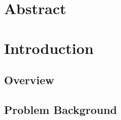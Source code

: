 \documentclass[12pt, twoside]{report}
\begin{document}
\chapter*{Abstract}
\lipsum[1-1]


\chapter{Introduction} 
\thispagestyle{empty}

\section{Overview}
\lipsum[4-6]

\section{Problem Background}
\end{document}
